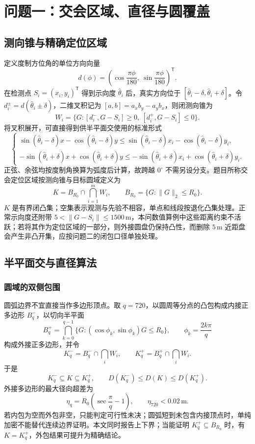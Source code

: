 \section{问题一：交会区域、直径与圆覆盖}

\subsection{测向锥与精确定位区域}
定义度制方位角的单位方向向量
\[
d(\phi)=\left(\cos\frac{\pi\phi}{180},\ \sin\frac{\pi\phi}{180}\right)^{\mathsf T}.
\]
在检测点 $S_i=(x_i,y_i)^{\mathsf T}$ 得到示向度 $\hat\theta_i$ 后，真实方向位于 $[\hat\theta_i-\delta,\hat\theta_i+\delta]$。令 $d_i^\pm=d(\hat\theta_i\pm\delta)$，二维叉积记为 $[a,b]=a_xb_y-a_yb_x$，则闭测向锥为
\[
W_i=\{G:[d_i^-,G-S_i]\ge0,\ [d_i^+,G-S_i]\le0\}.
\]
将叉积展开，可直接得到供半平面交使用的标准形式
\[
\begin{cases}
\sin(\hat\theta_i-\delta)x-\cos(\hat\theta_i-\delta)y
 \le \sin(\hat\theta_i-\delta)x_i-\cos(\hat\theta_i-\delta)y_i,\\
-\sin(\hat\theta_i+\delta)x+\cos(\hat\theta_i+\delta)y
 \le-\sin(\hat\theta_i+\delta)x_i+\cos(\hat\theta_i+\delta)y_i.
\end{cases}
\]
正弦、余弦均按度制角换算为弧度后计算，故跨越 $0^\circ$ 不需另设分支。题目所称交会定位区域按测向锥与目标圆域定义为
\[
K=B_{R_0}\cap\bigcap_{i=1}^{m}W_i,\qquad
B_{R_0}=\{G:\lVert G\rVert_2\le R_0\}.
\]
$K$ 是有界闭凸集；空集表示观测与先验不相容，单点和线段按退化凸集处理。正常示向度还附带 $5<\lVert G-S_i\rVert\le1500\,\mathrm m$，本问数值算例中这些距离约束不活跃；若将其作为定位区域的一部分，则外接圆盘仍保持凸性，而删除 $5\,\mathrm m$ 近距盘会产生非凸开集，应按问题二的闭包口径单独处理。

\subsection{半平面交与直径算法}

\subsubsection{圆域的双侧包围}
圆弧边界不宜直接当作多边形顶点。取 $q=720$，以圆周等分点的凸包构成内接正多边形 $B_q^-$，以切向半平面
\[
B_q^+=\bigcap_{k=0}^{q-1}\{G:(\cos\phi_k,\sin\phi_k)G\le R_0\},\qquad
\phi_k=\frac{2k\pi}{q}
\]
构成外接正多边形，并令
\[
K_q^-=B_q^-\cap\bigcap_iW_i,\qquad
K_q^+=B_q^+\cap\bigcap_iW_i.
\]
于是
\[
K_q^-\subseteq K\subseteq K_q^+,\qquad
D(K_q^-)\le D(K)\le D(K_q^+).
\]
外接多边形的最大径向超差为
\[
\eta_q=R_0\!\left(\sec\frac{\pi}{q}-1\right),\qquad
\eta_{720}<0.02\,\mathrm m.
\]
若内包为空而外包非空，只能判定可行性未决；圆弧短到未包含内接顶点时，单纯加密不能替代连续边界证明。本文同时报告上下界；当能证明 $K_q^+\subseteq B_{R_0}$ 时，有 $K=K_q^+$，外包结果可提升为精确结论。


